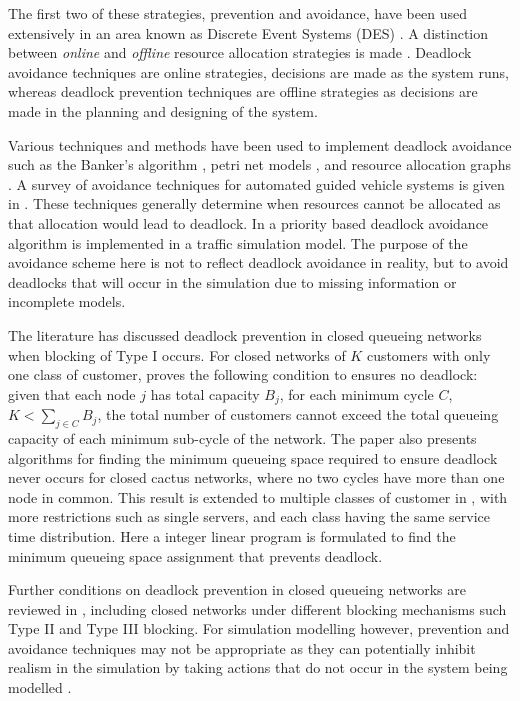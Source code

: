 \documentclass{article}
\numberwithin{equation}{section}
\begin{document}
The first two of these strategies, prevention and avoidance, have been used
extensively in an area known as Discrete Event Systems (DES)
\cite{reveliotis15a, reveliotis15b}.
A distinction between \textit{online} and \textit{offline} resource allocation
strategies is made \cite{venkateshsmith05}.
Deadlock avoidance techniques are online strategies, decisions are made as the
system runs, whereas deadlock prevention techniques are offline strategies as
decisions are made in the planning and designing of the system.

Various techniques and methods have been used to implement deadlock avoidance
such as the Banker's algorithm \cite{dijkstra82, kawadkaretal14}, petri net
models \cite{viswanadhametal90, ezpeletaetal02, marchettimunierkordon09}, and
resource allocation graphs \cite{belik90}.
A survey of avoidance techniques for automated guided vehicle systems is given
in \cite{vis06}.
These techniques generally determine when resources cannot be allocated as
that allocation would lead to deadlock.
In \cite{florianetal08} a priority based deadlock avoidance algorithm is
implemented in a traffic simulation model.
The purpose of the avoidance scheme here is not to reflect deadlock avoidance
in reality, but to avoid deadlocks that will occur in the simulation due to
missing information or incomplete models.

The literature has discussed deadlock prevention in closed queueing networks
when blocking of Type I occurs.
For closed networks of $K$ customers with only one class of customer,
\cite{kunduakyildiz89} proves the following condition to ensures no deadlock:
given that each node $j$ has total capacity $B_j$, for each minimum cycle $C$,
$K < \sum_{j\in C} B_j$, the total number of customers cannot exceed the total
queueing capacity of each minimum sub-cycle of the network.
The paper also presents algorithms for finding the minimum queueing space
required to ensure deadlock never occurs for closed cactus networks, where no
two cycles have more than one node in common.
This result is extended to multiple classes of customer in
\cite{liebeherrakyildiz95}, with more restrictions such as single servers, and
each class having the same service time distribution.
Here a integer linear program is formulated to find the minimum queueing space
assignment that prevents deadlock.

Further conditions on deadlock prevention in closed queueing networks are
reviewed in \cite{onvural90}, including closed networks under different
blocking mechanisms such Type II and Type III blocking.
For simulation modelling however, prevention and avoidance techniques may not
be appropriate as they can potentially inhibit realism in the simulation by
taking actions that do not occur in the system being modelled
\cite{venkateshetal98}.
\end{document}
